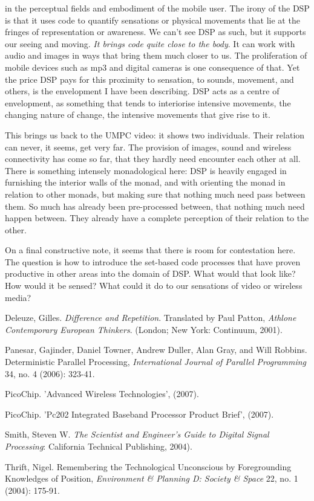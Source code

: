 in the perceptual fields and embodiment of the mobile user. The irony
of the DSP is that it uses code to quantify sensations or physical
movements that lie at the fringes of representation or awareness. We
can't see DSP as such, but it supports our seeing and
moving. {\em It brings code quite close to the body}. It can work
with audio and images in ways that bring them much closer to us. The
proliferation of mobile devices such as mp3 and digital cameras is one
consequence of that. Yet the price DSP pays for this proximity to
sensation, to sounds, movement, and others, is the envelopment I have
been describing. DSP acts as a centre of envelopment, as something that
tends to interiorise intensive movements, the changing nature of
change, the intensive movements that give rise to it. 
\item This brings us back to the UMPC video: it shows two individuals.
Their relation can never, it seems, get very far. The provision of
images, sound and wireless connectivity has come so far, that they
hardly need encounter each other at all. There is something intensely
monadological here: DSP is heavily engaged in furnishing the interior
walls of the monad, and with orienting the monad in relation to other
monads, but making sure that nothing much need pass between them. So
much has already been pre{}-processed between, that nothing much need
happen between. They already have a complete perception of their
relation to the other. 
\item On a final constructive note, it seems that there is room for
contestation here. The question is how to introduce the set{}-based
code processes that have proven productive in other areas into the
domain of DSP. What would that look like? How would it be sensed? What
could it do to our sensations of video or wireless media?
\stopitemize

\page


Deleuze, Gilles. {\em Difference and Repetition}. Translated by Paul Patton, {\em Athlone Contemporary European Thinkers}. (London; New
York: Continuum, 2001).

Panesar, Gajinder, Daniel Towner, Andrew Duller, Alan Gray, and Will Robbins. {\quote Deterministic Parallel Processing}, {\em International Journal of Parallel
Programming} 34, no. 4 (2006): 323{}-41.

PicoChip. 'Advanced Wireless Technologies', (2007). 

PicoChip. 'Pc202 Integrated Baseband Processor Product Brief', (2007). 

Smith, Steven W. {\em The Scientist and Engineer's Guide to Digital Signal Processing}: California Technical Publishing, 2004).

Thrift, Nigel. {\quote Remembering the Technological Unconscious by Foregrounding Knowledges of Position}, {\em Environment \& Planning D: Society \& Space} 22, no. 1 (2004): 175{}-91.

